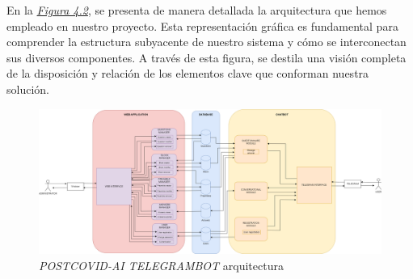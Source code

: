 En la \textit{\hyperref[fig:arquitectura]{Figura 4.2}}, se presenta de manera detallada la arquitectura que hemos empleado en nuestro proyecto. Esta representación gráfica es fundamental para comprender la estructura subyacente de nuestro sistema y cómo se interconectan sus diversos componentes. A través de esta figura, se destila una visión completa de la disposición y relación de los elementos clave que conforman nuestra solución.

\clearpage

\begin{figure}
    \centering
    \includegraphics[width=1\textheight]{imagenes/Arquitecture2.drawio.png}
    \caption{\textit{POSTCOVID-AI TELEGRAMBOT} arquitectura}
    \label{fig:arquitectura}
\end{figure}
\clearpage

